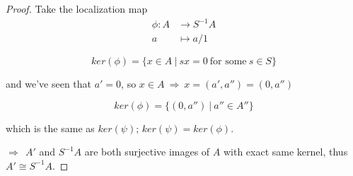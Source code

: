 \documentclass{article}
\theoremstyle{definition}
\begin{document}
\begin{proof}
  \vspace{0.5cm}
  Take the localization map
  \begin{align*}
    \phi: A &\longrightarrow S^{-1}A\\
    a &\longmapsto a/1
  \end{align*}

  $$ker(\phi) = \{ x \in A ~|~ sx=0 ~\text{for some}~ s \in S \}$$

  and we've seen that $a'=0$, so $x \in A ~\Rightarrow~ x=(a', a'') = (0, a'')$

  $$ker(\phi) = \{ (0, a'') ~|~ a'' \in A'' \}$$

  which is the same as $ker(\psi)$; $ker(\psi) = ker(\phi)$.

  \vspace{0.2cm}
  $\Longrightarrow~~ A'$ and $S^{-1}A$ are both surjective images of $A$ with exact same kernel,
  thus $A' \cong S^{-1}A$.
\end{proof}
\end{document}
